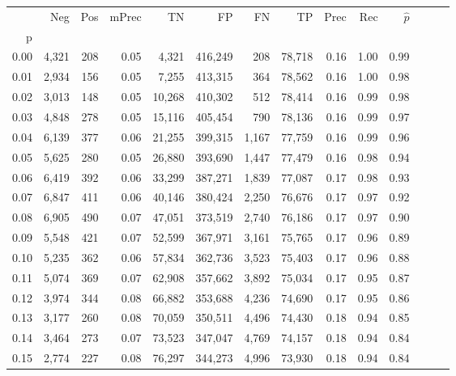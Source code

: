 \begin{tabular}{rrrrrrrrrrrrrr}
\toprule
{} &    Neg &    Pos & mPrec &       TN &       FP &      FN &      TP &  Prec &   Rec & $\hat{p}$ \\
p    &        &        &       &          &          &         &         &       &       &           \\
\midrule
0.00 &  4,321 &    208 &  0.05 &    4,321 &  416,249 &     208 &  78,718 &  0.16 &  1.00 &      0.99 \\
0.01 &  2,934 &    156 &  0.05 &    7,255 &  413,315 &     364 &  78,562 &  0.16 &  1.00 &      0.98 \\
0.02 &  3,013 &    148 &  0.05 &   10,268 &  410,302 &     512 &  78,414 &  0.16 &  0.99 &      0.98 \\
0.03 &  4,848 &    278 &  0.05 &   15,116 &  405,454 &     790 &  78,136 &  0.16 &  0.99 &      0.97 \\
0.04 &  6,139 &    377 &  0.06 &   21,255 &  399,315 &   1,167 &  77,759 &  0.16 &  0.99 &      0.96 \\
0.05 &  5,625 &    280 &  0.05 &   26,880 &  393,690 &   1,447 &  77,479 &  0.16 &  0.98 &      0.94 \\
0.06 &  6,419 &    392 &  0.06 &   33,299 &  387,271 &   1,839 &  77,087 &  0.17 &  0.98 &      0.93 \\
0.07 &  6,847 &    411 &  0.06 &   40,146 &  380,424 &   2,250 &  76,676 &  0.17 &  0.97 &      0.92 \\
0.08 &  6,905 &    490 &  0.07 &   47,051 &  373,519 &   2,740 &  76,186 &  0.17 &  0.97 &      0.90 \\
0.09 &  5,548 &    421 &  0.07 &   52,599 &  367,971 &   3,161 &  75,765 &  0.17 &  0.96 &      0.89 \\
0.10 &  5,235 &    362 &  0.06 &   57,834 &  362,736 &   3,523 &  75,403 &  0.17 &  0.96 &      0.88 \\
0.11 &  5,074 &    369 &  0.07 &   62,908 &  357,662 &   3,892 &  75,034 &  0.17 &  0.95 &      0.87 \\
0.12 &  3,974 &    344 &  0.08 &   66,882 &  353,688 &   4,236 &  74,690 &  0.17 &  0.95 &      0.86 \\
0.13 &  3,177 &    260 &  0.08 &   70,059 &  350,511 &   4,496 &  74,430 &  0.18 &  0.94 &      0.85 \\
0.14 &  3,464 &    273 &  0.07 &   73,523 &  347,047 &   4,769 &  74,157 &  0.18 &  0.94 &      0.84 \\
0.15 &  2,774 &    227 &  0.08 &   76,297 &  344,273 &   4,996 &  73,930 &  0.18 &  0.94 &      0.84 \\

\end{tabular}
